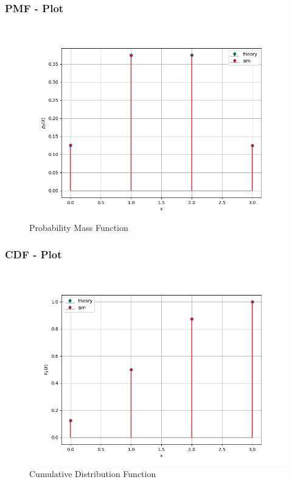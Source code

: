 \documentclass{beamer}
\begin{document}
\begin{frame}
\frametitle{PMF - Plot}
\begin{figure}[h]
\centering
\includegraphics[width=\columnwidth]{figs/pmf.png}
\caption{Probability Mass Function}
\label{fig:Plot1} 
\end{figure}
\end{frame}

\begin{frame}
\frametitle{CDF - Plot}
\begin{figure}[h]
\centering
\includegraphics[width=\columnwidth]{figs/cdf.png}
\caption{Cumulative Distribution Function}
\label{fig:Plot2} 
\end{figure}
\end{frame}
\end{document}

